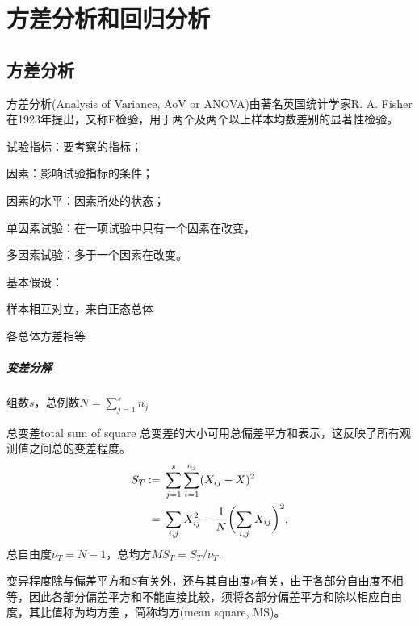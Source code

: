 \chapter{方差分析和回归分析}

\section{方差分析}

方差分析(Analysis of Variance, AoV or ANOVA)由著名英国统计学家R. A. Fisher在1923年提出，又称F检验，用于两个及两个以上样本均数差别的显著性检验。

\begin{definition}{}{}
	试验指标：要考察的指标；

	因素：影响试验指标的条件；

	因素的水平：因素所处的状态；
	
	单因素试验：在一项试验中只有一个因素在改变，

	多因素试验：多于一个因素在改变。
\end{definition}

基本假设：
\begin{compactenum}
	\item 样本相互对立，来自正态总体
	\item 各总体方差相等
\end{compactenum}

\paragraph{变差分解}

组数$s$，总例数$N=\textstyle\sum_{j=1}^sn_j$

\begin{definition}{总变差}{total sum of square}
	总变差的大小可用总偏差平方和表示，这反映了所有观测值之间总的变差程度。
	\begin{subequations}
		\begin{align}
			S_T:={}&\sum_{j=1}^s\sum_{i=1}^{n_j}(X_{ij}-\overline{X})^2\\\notag
			={}&\sum_{i,j}X_{ij}^2-\frac1N\biggl(\sum_{i,j}X_{ij}\biggr)^2,
		\end{align}
	\end{subequations}
	总自由度$\nu_T=N-1$，总均方$MS_T=S_T/\nu_T.$
\end{definition}

变异程度除与偏差平方和$S$有关外，还与其自由度$\nu$有关，由于各部分自由度不相等，因此各部分偏差平方和不能直接比较，须将各部分偏差平方和除以相应自由度，其比值称为均方差 ，简称均方(mean square, MS)。

